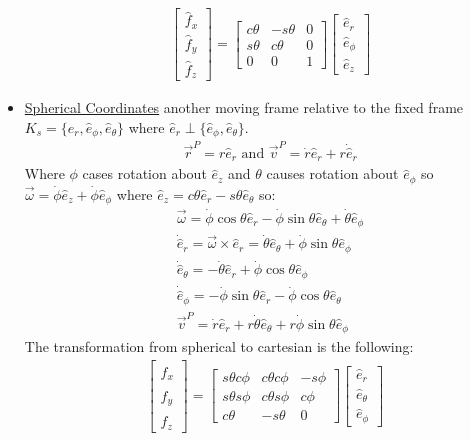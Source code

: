 \documentclass[conference]{IEEEtran}
\begin{document}
\begin{itemize}
\begin{align*}
    & \begin{bmatrix} \hat{f}_x \\ \hat{f}_y \\ \hat{f}_z \end{bmatrix} = \begin{bmatrix} c\theta & -s\theta & 0 \\ s\theta & c\theta & 0 \\ 0 & 0 & 1 \end{bmatrix} \begin{bmatrix} \hat{e}_r \\ \hat{e}_\phi \\ \hat{e}_z \end{bmatrix}
   \end{align*}
   \item \underline{Spherical Coordinates} another moving frame relative to the fixed frame $K_s = \{\hat{e}_r, \hat{e}_\phi, \hat{e}_\theta\}$ where $\hat{e}_r \perp \{\hat{e}_\phi, \hat{e}_{\theta}\}$.
   \begin{align*}
    & \vec{r}^P = r \hat{e}_r \text{ and } \vec{v}^P = \dot{r} \hat{e}_r + r \dot{\hat{e}}_r
   \end{align*}
   Where $\phi$ cases rotation about $\hat{e}_z$ and $\theta$ causes rotation about $\hat{e}_\phi$ so $\vec{\omega} = \dot{\phi} \hat{e}_z + \dot{\phi} \hat{e}_\phi$ where $\hat{e}_z = c\theta \hat{e}_r - s\theta \hat{e}_\theta$ so:
   \begin{align*}
    & \vec{\omega} = \dot{\phi}\cos\theta \hat{e}_r - \dot{\phi}\sin\theta\hat{e}_\theta + \dot{\theta} \hat{e}_\phi \\
    & \dot{\hat{e}}_r = \vec{\omega} \times \hat{e}_r = \dot{\theta} \hat{e}_\theta + \dot{\phi} \sin\theta \hat{e}_\phi \\
    & \dot{\hat{e}}_\theta = - \dot{\theta} \hat{e}_r + \dot{\phi} \cos\theta \hat{e}_\phi \\
    & \dot{\hat{e}}_\phi = - \dot{\phi} \sin \theta \hat{e}_r - \dot{\phi} \cos \theta \hat{e}_\theta \\
    & \vec{v}^P = \dot{r} \hat{e}_r + r \dot{\theta} \hat{e}_\theta + r \dot{\phi} \sin \theta \hat{e}_\phi
   \end{align*}
   The transformation from spherical to cartesian is the following:
   \begin{align*}
    \begin{bmatrix} \hat{f}_x \\ \hat{f}_y \\ \hat{f}_z \end{bmatrix} = \begin{bmatrix} s\theta c\phi & c\theta c\phi & -s\phi \\ s\theta s\phi & c\theta s\phi & c\phi \\ c\theta & -s\theta & 0 \end{bmatrix}\begin{bmatrix} \hat{e}_r \\ \hat{e}_\theta \\ \hat{e}_\phi \end{bmatrix}
   \end{align*}
\end{itemize}
\end{document}
